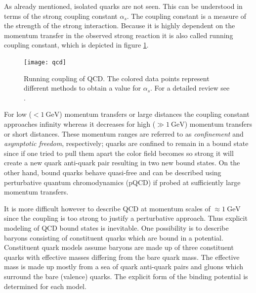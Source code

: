  As already mentioned, isolated quarks are not seen. This can be understood in terms of the strong coupling constant $\alpha_s$. The coupling constant is a measure of the strength of the strong interaction. Because it is highly dependent on the momentum transfer in the observed strong reaction it is also called running coupling constant, which is depicted in figure \ref{fig:coupl}.
 \begin{figure}
 	\centering
 	\texttt{[image: qcd]}
 	\caption{Running coupling of QCD. The colored data points represent different methods to obtain a value for $\alpha_s$. For a detailed review see \cite{pdg}.}
 	\label{fig:coupl}
 \end{figure}

 For low ($<\SI{1}{\GeV}$) momentum transfers or large distances the coupling constant approaches infinity whereas it decreases for high ($\gg\SI{1}{\GeV}$) momentum transfers or short distances. These momentum ranges are referred to as \emph{confinement} and \emph{asymptotic freedom}, respectively; quarks are confined to remain in a bound state since if one tried to pull them apart the color field becomes so strong it will create a new quark anti-quark pair resulting in two new bound states. On the other hand, bound quarks behave quasi-free and can be described using perturbative quantum chromodynamics (pQCD) if probed at sufficiently large momentum transfers.

 It is more difficult however to describe QCD at momentum scales of $\approx \SI{1}{\GeV}$ since the coupling is too strong to justify a perturbative approach. Thus explicit modeling of QCD bound states is inevitable. One possibility is to describe baryons consisting of constituent quarks which are bound in a potential. Constituent quark models assume baryons are made up of three constituent quarks with effective masses differing from the bare quark mass. The effective mass is made up mostly from a sea of quark anti-quark pairs and gluons which surround the bare (valence) quarks. The explicit form of the binding potential is determined for each model.


